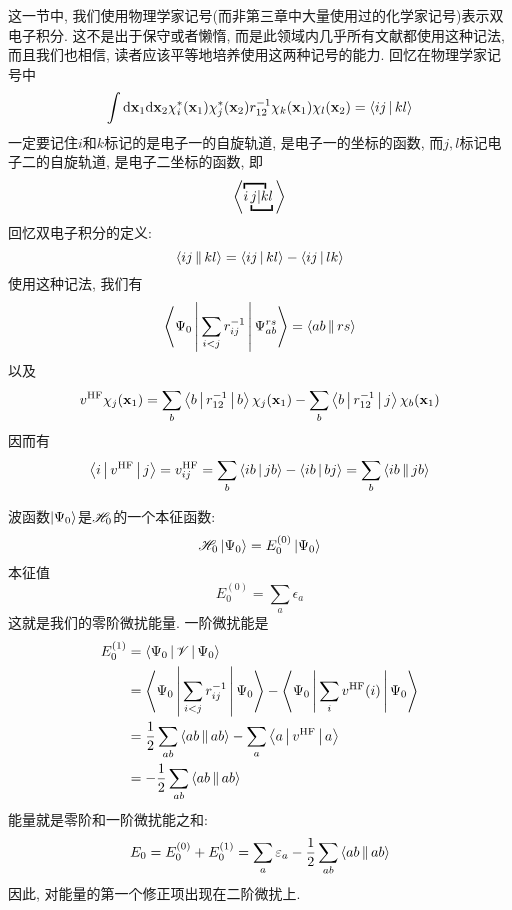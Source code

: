 这一节中, 
我们使用物理学家记号(而非第三章中大量使用过的化学家记号)表示双电子积分. 
这不是出于保守或者懒惰, 
而是此领域内几乎所有文献都使用这种记法, 
而且我们也相信, 
读者应该平等地培养使用这两种记号的能力. 
回忆在物理学家记号中
\begin{equation}
\int\dd{x}_1\dd{x}_2 \chi_i^*(\mathbf{x}_1)\chi_j^*(\mathbf{x}_2)r_{12}^{-1}\chi_k(\mathbf{x}_1)\chi_l(\mathbf{x}_2) = \braket{ij|kl}
\end{equation}
一定要记住$i$和$k$标记的是电子一的自旋轨道, 是电子一的坐标的函数, 而$j,l$标记电子二的自旋轨道, 是电子二坐标的函数, 即
\begin{equation*}
\bigg\langle\lefteqn{\overbracket{\phantom{ij|k}}}i\underbracket{j|kl}\bigg\rangle
\end{equation*}
回忆双电子积分的定义:
\begin{equation}
\Braket{ij||kl}=\Braket{ij|kl}-\Braket{ij|lk}
\end{equation}
使用这种记法, 
我们有
\begin{align}
\Braket{\Psi_0|\sum_{i<j}r_{ij}^{-1}|\Psi_{ab}^{rs}} = \Braket{ab||rs}
\end{align}
以及
\begin{align}
v^\mathrm{HF}\chi_j(\mathbf{x}_1)=\sum_b\Braket{b|r_{12}^{-1}|b}\chi_j(\mathbf{x}_1) - \sum_b\Braket{b|r_{12}^{-1}|j}\chi_{b}(\mathbf{x}_1)
\end{align}
因而有
\begin{align}
\Braket{i|v^\mathrm{HF}|j} = v_{ij}^\mathrm{HF} = \sum_{b}\Braket{ib|jb} - \Braket{ib|bj} = \sum_b\Braket{ib||jb}
\end{align}

\hft 波函数$\Ket{\Psi_0}$是$\mathscr{H}_0$的一个本征函数:
\begin{equation}
\mathscr{H}_0\Ket{\Psi_0} = E_0^{(0)}\Ket{\Psi_0}
\end{equation}
本征值
\begin{equation}
E_0^{(0)} = \sum_a\epsilon_a
\end{equation}
这就是我们的零阶微扰能量. 
一阶微扰能是
\begin{align}
E_0^{(1)} & = \Braket{\Psi_0|\mathscr{V}|\Psi_0} \notag\\
          & = \Braket{\Psi_0|\sum_{i<j}r_{ij}^{-1}|\Psi_0} - \Braket{\Psi_0|\sum_i v^\mathrm{HF}(i)|\Psi_0} \notag \\
          & = \frac{1}{2}\sum_{ab}\Braket{ab||ab} - \sum_a\Braket{a|v^\mathrm{HF}|a} \notag\\
          & = -\frac{1}{2}\sum_{ab} \Braket{ab||ab}
\end{align}
\hft 能量就是零阶和一阶微扰能之和:
\begin{align}
E_0 = E_0^{(0)} + E_0^{(1)} = \sum_a\varepsilon_a - \frac{1}{2}\sum_{ab}\Braket{ab||ab}
\end{align}
因此, 
对\hft 能量的第一个修正项出现在二阶微扰上.


